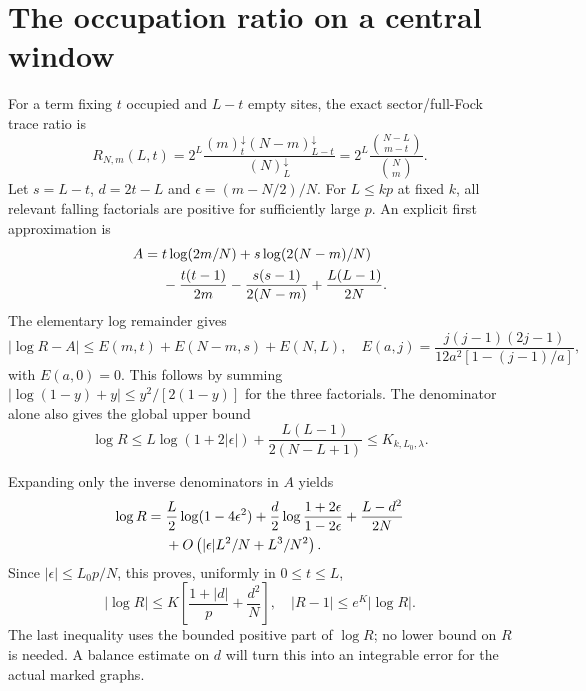 \documentclass[11pt,a4paper]{article}
\begin{document}
\newpage
\section{The occupation ratio on a central window}
For a term fixing $t$ occupied and $L-t$ empty sites, the exact
sector/full-Fock trace ratio is
\begin{equation}
 R_{N,m}(L,t)=2^L\frac{(m)_t^\downarrow(N-m)_{L-t}^\downarrow}
                         {(N)_L^\downarrow}
       =2^L\frac{\binom{N-L}{m-t}}{\binom Nm}.\label{ratio}
\end{equation}
Let $s=L-t$, $d=2t-L$ and $\epsilon=(m-N/2)/N$.
For $L\le kp$ at fixed $k$, all relevant falling factorials are
positive for sufficiently large $p$. An explicit first approximation is
\begin{align}
 A={}&t\log(2m/N)+s\log(2(N-m)/N)\notag\\
 &-\frac{t(t-1)}{2m}-\frac{s(s-1)}{2(N-m)}+\frac{L(L-1)}{2N}.
\end{align}
The elementary log remainder gives
\begin{equation}
 |\log R-A|\le E(m,t)+E(N-m,s)+E(N,L),\quad
 E(a,j)=\frac{j(j-1)(2j-1)}{12a^2[1-(j-1)/a]},\label{error}
\end{equation}
with $E(a,0)=0$. This follows by summing
$|\log(1-y)+y|\le y^2/[2(1-y)]$ for the three factorials.
The denominator alone also gives the global upper bound
\begin{equation}
 \log R\le L\log(1+2|\epsilon|)
                 +\frac{L(L-1)}{2(N-L+1)}\le K_{k,L_0,\lambda}.
 \label{upper}
\end{equation}

Expanding only the inverse denominators in $A$ yields
\begin{align}
 \log R={}&\frac L2\log(1-4\epsilon^2)
       +\frac d2\log\frac{1+2\epsilon}{1-2\epsilon}
       +\frac{L-d^2}{2N}\notag\\
       &+O\left(|\epsilon|L^2/N+L^3/N^2\right).
\end{align}
Since $|\epsilon|\le L_0p/N$, this proves, uniformly in $0\le t\le L$,
\begin{equation}
 |\log R|\le K\left[\frac{1+|d|}{p}+\frac{d^2}{N}\right],\quad
 |R-1|\le e^K|\log R|.\label{balanced}
\end{equation}
The last inequality uses the bounded positive part of $\log R$;
no lower bound on $R$ is needed. A balance estimate on $d$ will
turn this into an integrable error for the actual marked graphs.

\newpage
\end{document}

